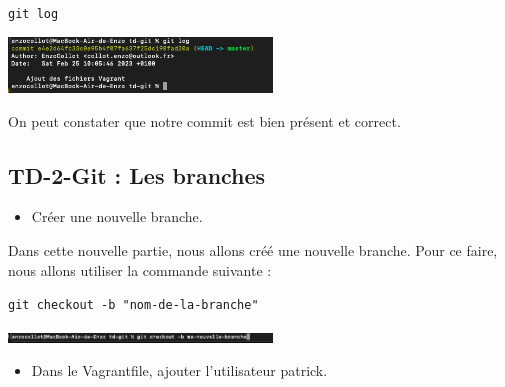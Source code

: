 \documentclass[12pt]{article}
\begin{document}
\texttt{git log}

\vspace{0.3cm}

\begin{center}
  \includegraphics[width=7cm]{Image-TD-Git-1/git-log.png}
\end{center}

\vspace{0.3cm}

On peut constater que notre commit est bien présent et correct.

\newpage

\subsection{TD-2-Git : Les branches}

\vspace{0.3cm}

\begin{itemize}
  \item Créer une nouvelle branche.
\end{itemize}

\vspace{0.3cm}

Dans cette nouvelle partie, nous allons créé une nouvelle branche. Pour ce faire, nous allons utiliser la commande suivante : 

\texttt{git checkout -b "nom-de-la-branche"}

\vspace{0.3cm}

\begin{center}
  \includegraphics[width=7cm]{Image-TD-Git-2/git-checkout.png}
\end{center}

\vspace{0.3cm}

\begin{itemize}
  \item Dans le Vagrantfile, ajouter l'utilisateur patrick.
\end{itemize}

\vspace{0.3cm}
\end{document}
